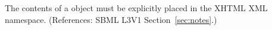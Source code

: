 The contents of a \Notes object must be explicitly placed in the
XHTML XML namespace.  (References: SBML L3V1 Section~\ref{sec:notes}.)
